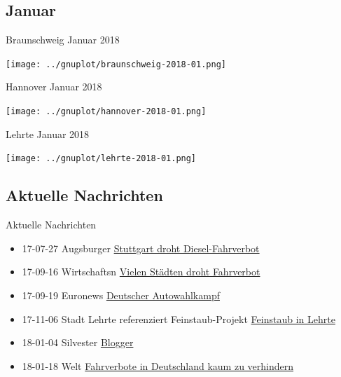 \documentclass[aspectratio=169]{beamer} %
\begin{document}
\subsection{Januar}
\begin{frame}{Braunschweig Januar 2018}
  \begin{center}
    \texttt{[image: ../gnuplot/braunschweig-2018-01.png]}
  \end{center}
\end{frame}
\begin{frame}{Hannover Januar 2018}
  \begin{center}
    \texttt{[image: ../gnuplot/hannover-2018-01.png]}
  \end{center}
\end{frame}
\begin{frame}{Lehrte Januar 2018}
  \begin{center}
    \texttt{[image: ../gnuplot/lehrte-2018-01.png]}
  \end{center}
\end{frame}

\subsection{Aktuelle Nachrichten}
\begin{frame}{Aktuelle Nachrichten}
  \begin{itemize}
  \item 17-07-27 Augsburger \href{http://www.augsburger-allgemeine.de/panorama/In-Stuttgart-droht-jetzt-ein-Diesel-Fahrverbot-id42204121.html}{Stuttgart droht Diesel-Fahrverbot}
  \item 17-09-16 Wirtschaftsn \href{https://deutsche-wirtschafts-nachrichten.de/2017/09/16/feinstaub-belastung-vielen-staedten-drohen-fahrverbote/}{Vielen Städten droht Fahrverbot}
  \item 17-09-19 Euronews \href{http://de.euronews.com/2017/09/19/der-deutsche-autowahlkampf}{Deutscher Autowahlkampf}
  \item 17-11-06 Stadt Lehrte referenziert Feinstaub-Projekt \href{http://piratenpartei-lehrte.de/2017/09/11/feinstaub-in-lehrte/}{Feinstaub in Lehrte}
  \item 18-01-04 Silvester \href{https://sbamueller.wordpress.com/2018/01/01/silvester-und-feinstaub/}{Blogger}
  \item 18-01-18 Welt \href{https://www.welt.de/wirtschaft/article172580444/Fahrverbote-kann-Deutschland-kaum-noch-verhindern.html}{Fahrverbote in Deutschland kaum zu verhindern}
  \end{itemize}
\end{frame}
\end{document}
